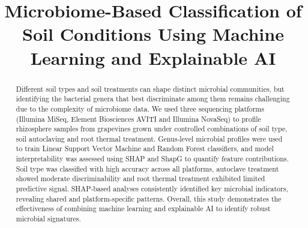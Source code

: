 \documentclass[12pt]{article}
\theoremstyle{thmstyleone}%
\theoremstyle{thmstyletwo}%
\theoremstyle{thmstylethree}%
\begin{document}
\title{Microbiome-Based Classification of Soil Conditions Using Machine Learning and Explainable AI}
\date{}  %
\maketitle



\begin{abstract}
Different soil types and soil treatments can shape distinct microbial communities, but identifying the bacterial genera that best discriminate among them remains challenging due to the complexity of microbiome data. We used three sequencing platforms (Illumina MiSeq, Element Biosciences AVITI and Illumina NovaSeq) to profile rhizosphere samples from grapevines grown under controlled combinations of soil type, soil autoclaving and root thermal treatment. Genus‑level microbial profiles were used to train Linear Support Vector Machine and Random Forest classifiers, and model interpretability was assessed using SHAP and ShapG to quantify feature contributions. Soil type was classified with high accuracy across all platforms, autoclave treatment showed moderate discriminability and root thermal treatment exhibited limited predictive signal. SHAP‑based analyses consistently identified key microbial indicators, revealing shared and platform‑specific patterns. Overall, this study demonstrates the effectiveness of combining machine learning and explainable AI to identify robust microbial signatures.
\end{abstract}
\end{document}
